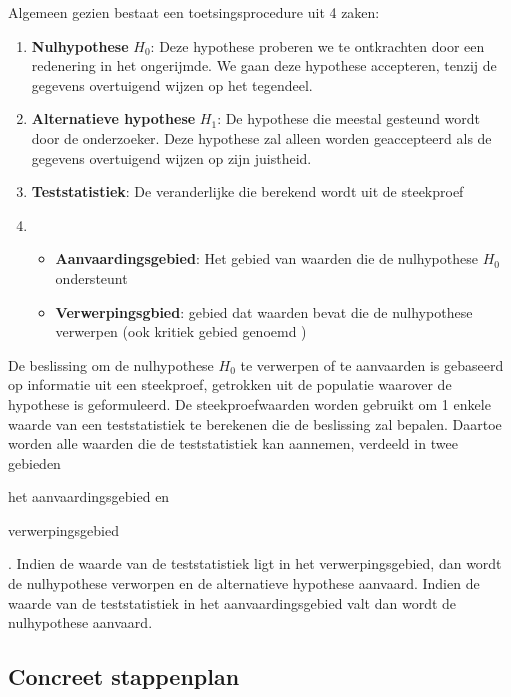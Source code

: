 Algemeen gezien bestaat een toetsingsprocedure uit 4 zaken:
\begin{enumerate}
  \item \textbf{Nulhypothese} $H_{0}$: Deze hypothese proberen we te ontkrachten door een redenering in het ongerijmde. We gaan deze hypothese accepteren, tenzij de gegevens overtuigend wijzen op het tegendeel.
  \item \textbf{Alternatieve hypothese} $H_{1}$: De hypothese die meestal gesteund wordt door de onderzoeker. Deze hypothese zal alleen worden geaccepteerd als de gegevens overtuigend wijzen op zijn juistheid.
  \item \textbf{Teststatistiek}: De veranderlijke die berekend wordt uit de steekproef
  \item
    \begin{itemize}
      \item \textbf{Aanvaardingsgebied}: Het gebied van waarden die de nulhypothese $H_{0}$ ondersteunt
      \item \textbf{Verwerpingsgbied}: gebied dat waarden bevat die de nulhypothese verwerpen (ook kritiek gebied genoemd )
    \end{itemize}
\end{enumerate}

De beslissing om de nulhypothese $H_{0}$ te verwerpen of te aanvaarden is gebaseerd op informatie uit een steekproef, getrokken uit de populatie waarover de hypothese is geformuleerd. De steekproefwaarden worden gebruikt om 1 enkele waarde van een teststatistiek te berekenen die de beslissing zal bepalen. Daartoe worden alle waarden die de teststatistiek kan aannemen, verdeeld in twee gebieden\begin{inparaenum}[(i)] \item het aanvaardingsgebied en \item verwerpingsgebied\end{inparaenum}. Indien de waarde van de teststatistiek ligt in het verwerpingsgebied, dan wordt de nulhypothese verworpen en de alternatieve hypothese aanvaard. Indien de waarde van de teststatistiek in het aanvaardingsgebied valt dan wordt de nulhypothese aanvaard.

  \subsection{Concreet stappenplan}

